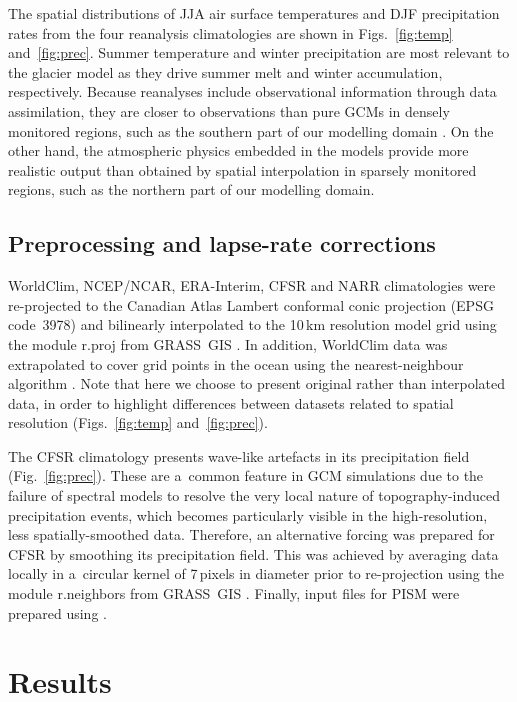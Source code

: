 \documentclass[tc, ms]{copernicus}
\begin{document}
The spatial distributions of JJA air surface temperatures and DJF precipitation rates from the four reanalysis climatologies are shown in Figs.~\ref{fig:temp} and~\ref{fig:prec}. Summer temperature and winter precipitation are most relevant to the glacier model as they drive summer melt and winter accumulation, respectively. Because reanalyses include observational information through data assimilation, they are closer to observations than pure GCMs in densely monitored regions, such as the southern part of our modelling domain \citep{bengtsson-etal-2007}. On the other hand, the atmospheric physics embedded in the models provide more realistic output than obtained by spatial interpolation in sparsely monitored regions, such as the northern part of our modelling domain.

\subsection{Preprocessing and lapse-rate corrections}

WorldClim, NCEP/NCAR, ERA-Interim, CFSR and NARR climatologies were re-projected to the Canadian Atlas Lambert conformal conic projection (EPSG code~3978) and bilinearly interpolated to the 10\,km resolution model grid using the module r.proj from GRASS~GIS \citep{soft:grass}. In addition, WorldClim data was extrapolated to cover grid points in the ocean using the nearest-neighbour algorithm \citep{soft:scipy}. Note that here we choose to present original rather than interpolated data, in order to highlight differences between datasets related to spatial resolution (Figs.~\ref{fig:temp} and~\ref{fig:prec}).

The CFSR climatology presents wave-like artefacts in its precipitation field (Fig.~\ref{fig:prec}). These are a~common feature in GCM simulations due to the failure of spectral models to resolve the very local nature of topography-induced precipitation events, which becomes particularly visible in the high-resolution, less spatially-smoothed data. Therefore, an alternative forcing was prepared for CFSR by smoothing its precipitation field. This was achieved by averaging data locally in a~circular kernel of 7\,pixels in diameter prior to re-projection using the module r.neighbors from GRASS~GIS \citep{soft:grass}. Finally, input files for PISM were prepared using \citet{web:nc4py}.

\section{Results}
\label{sec:results}
\end{document}
